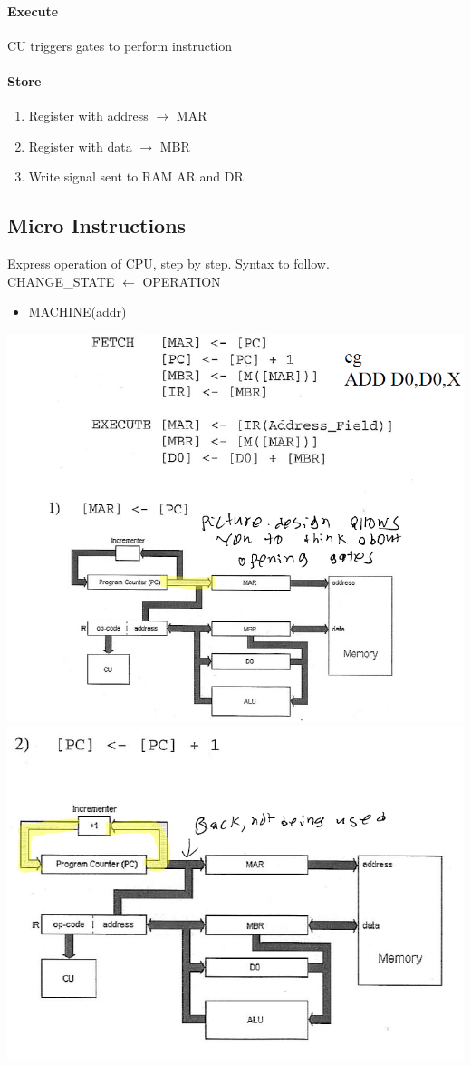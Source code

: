 \documentclass[12 pt]{article}
\begin{document}
		\paragraph{Execute}
		CU triggers gates to perform instruction
		\paragraph{Store}
		\begin{enumerate}
			\item Register with address $\to$ MAR
			\item Register with data $\to$ MBR
			\item Write signal sent to RAM AR and DR
		\end{enumerate}
		\subsection{Micro Instructions}
		Express operation of CPU, step by step. Syntax to follow.
		\\ CHANGE\_STATE $\gets $ OPERATION
		\begin{itemize}
			\item MACHINE(addr)
		\end{itemize}
		\includegraphics[scale=0.7]{mi1}
		\\\includegraphics[scale=0.7]{mi2}
\end{document}
